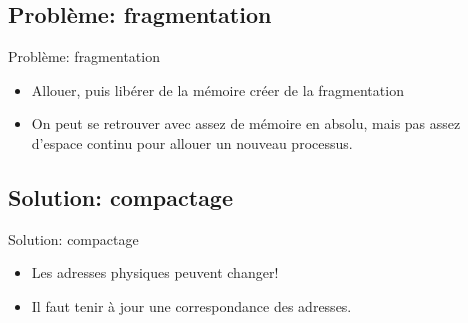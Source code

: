 \begin{frame}{\sectitle}
\def\subsectitle{Problème: fragmentation}
\subsection{\subsectitle}
\begin{block}{\subsectitle}
\begin{itemize}
    \item Allouer, puis libérer de la mémoire créer de la fragmentation
    \item On peut se retrouver avec assez de mémoire en absolu, mais pas assez
    d'espace continu pour allouer un nouveau processus.
\end{itemize}
\end{block}

\def\subsectitle{Solution: compactage}
\subsection{\subsectitle}
\begin{block}{\subsectitle}
\begin{itemize}
    \item Les adresses physiques peuvent changer!
    \item Il faut tenir à jour une correspondance des adresses.
\end{itemize}
\end{block}
\end{frame}

\def\sectitle{Pagination}
